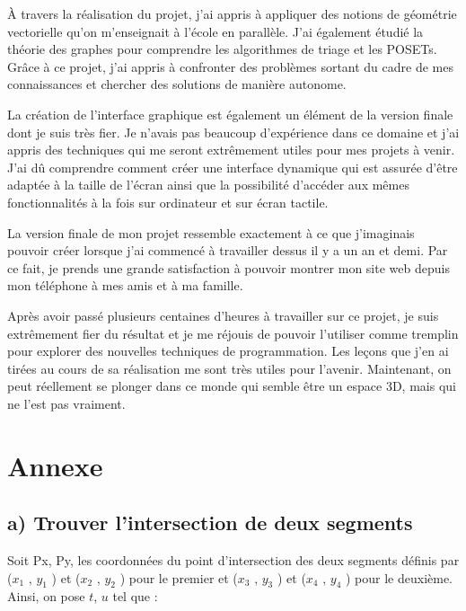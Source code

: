 \documentclass[11pt,french,a4paper,]{article}
\begin{document}
À travers la réalisation du projet, j'ai appris à appliquer des notions
de géométrie vectorielle qu'on m'enseignait à l'école en parallèle. J'ai
également étudié la théorie des graphes pour comprendre les algorithmes
de triage et les POSETs. Grâce à ce projet, j'ai appris à confronter des
problèmes sortant du cadre de mes connaissances et chercher des
solutions de manière autonome.

La création de l'interface graphique est également un élément de la
version finale dont je suis très fier. Je n'avais pas beaucoup
d'expérience dans ce domaine et j'ai appris des techniques qui me seront
extrêmement utiles pour mes projets à venir. J'ai dû comprendre comment
créer une interface dynamique qui est assurée d'être adaptée à la taille
de l'écran ainsi que la possibilité d'accéder aux mêmes fonctionnalités
à la fois sur ordinateur et sur écran tactile.

La version finale de mon projet ressemble exactement à ce que
j'imaginais pouvoir créer lorsque j'ai commencé à travailler dessus il y
a un an et demi. Par ce fait, je prends une grande satisfaction à
pouvoir montrer mon site web depuis mon téléphone à mes amis et à ma
famille.

Après avoir passé plusieurs centaines d'heures à travailler sur ce
projet, je suis extrêmement fier du résultat et je me réjouis de pouvoir
l'utiliser comme tremplin pour explorer des nouvelles techniques de
programmation. Les leçons que j'en ai tirées au cours de sa réalisation
me sont très utiles pour l'avenir. Maintenant, on peut réellement se
plonger dans ce monde qui semble être un espace 3D, mais qui ne l'est
pas vraiment.

\hypertarget{annexe}{%
\section{Annexe}\label{annexe}}

\hypertarget{a-trouver-lintersection-de-deux-segments}{%
\subsection{a) Trouver l'intersection de deux
segments}\label{a-trouver-lintersection-de-deux-segments}}

Soit Px, Py, les coordonnées du point d'intersection des deux segments
définis par (\(x_1\) , \(y_1\) ) et (\(x_2\) , \(y_2\) ) pour le premier
et (\(x_3\) , \(y_3\) ) et (\(x_4\) , \(y_4\) ) pour le deuxième. Ainsi,
on pose \(t\), \(u\) tel que :
\end{document}
